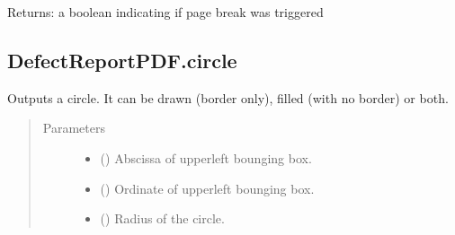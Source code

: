 \documentclass[letterpaper,10pt,english]{sphinxmanual}
\begin{document}
\begin{fulllineitems}
\begin{fulllineitems}
\begin{quote}
\begin{description}
\begin{itemize}
\end{itemize}

\end{description}\end{quote}

\sphinxAtStartPar
Returns: a boolean indicating if page break was triggered

\end{fulllineitems}



\subsection{DefectReportPDF.circle}
\label{\detokenize{generated/quality_assessment.quality_pdf_report.DefectReportPDF.circle:defectreportpdf-circle}}\label{\detokenize{generated/quality_assessment.quality_pdf_report.DefectReportPDF.circle::doc}}

\begin{fulllineitems}
\label{\detokenize{generated/quality_assessment.quality_pdf_report.DefectReportPDF.circle:quality_assessment.quality_pdf_report.DefectReportPDF.circle}}
\sphinxAtStartPar
Outputs a circle.
It can be drawn (border only), filled (with no border) or both.
\begin{quote}\begin{description}
\item[{Parameters}] \leavevmode\begin{itemize}
\item {} 
\sphinxAtStartPar
{} () \textendash{} Abscissa of upper\sphinxhyphen{}left bounging box.

\item {} 
\sphinxAtStartPar
{} () \textendash{} Ordinate of upper\sphinxhyphen{}left bounging box.

\item {} 
\sphinxAtStartPar
{} () \textendash{} Radius of the circle.


\end{itemize}
\end{description}
\end{quote}
\end{fulllineitems}
\end{fulllineitems}
\end{document}
